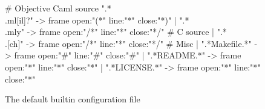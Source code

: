 \documentclass{article}
\begin{document}
\begin{figure}
\begin{center}
\begin{boxedverbatim}
# Objective Caml source 
  ".*\\.ml[il]?" -> frame open:"(*" line:"*" close:"*)"
| ".*\\.mly"     -> frame open:"/*" line:"*" close:"*/"
# C source
| ".*\\.[ch]"    -> frame open:"/*" line:"*" close:"*/"
# Misc
| ".*Makefile.*" -> frame open:"#"  line:"#" close:"#"
| ".*README.*"   -> frame open:"*"  line:"*" close:"*"
| ".*LICENSE.*"  -> frame open:"*"  line:"*" close:"*"
\end{boxedverbatim}
\end{center}
  \caption{The default builtin configuration file}
  \label{figure:config}
\end{figure}
\end{document}
